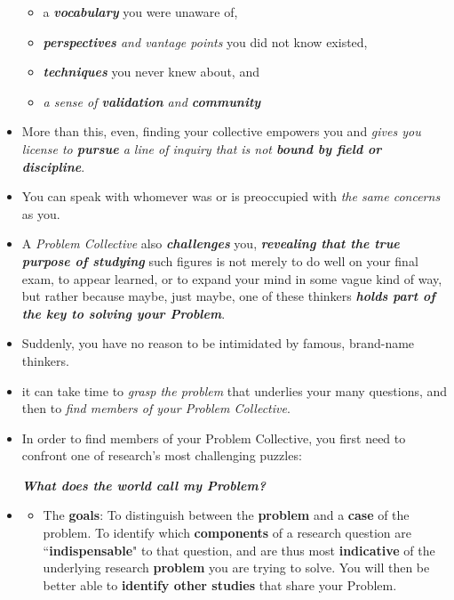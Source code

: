 \documentclass[11pt]{article}
\begin{document}
\begin{itemize}
\begin{itemize}
\item a \emph{\textbf{vocabulary}} you were unaware of,

\item \emph{\textbf{perspectives} and vantage points} you did not know existed,

\item \emph{\textbf{techniques}} you never knew about, and

\item \emph{a sense of \textbf{validation} and \textbf{community}}
\end{itemize}

\item More than this, even, finding your collective empowers you and \emph{gives you license to \textbf{pursue} a line of inquiry that is not \textbf{bound by field or discipline}}.

\item You can speak with whomever was or is preoccupied with \emph{the same concerns} as you.

\item A \emph{Problem Collective} also \emph{\textbf{challenges}} you, \emph{\textbf{revealing that the true purpose of studying}} such figures is not merely to do well on your final exam, to appear learned, or to expand your mind in some vague kind of way, but rather because maybe, just maybe, one of these thinkers \emph{\textbf{holds part of the key to solving your Problem}}.

\item Suddenly, you have no reason to be intimidated by famous, brand-name thinkers.

\item it can take time to \emph{grasp the problem} that underlies your many questions, and then to \emph{find members of your Problem Collective}. 

\item In order to find members of your Problem Collective, you first need to confront one of research’s most challenging puzzles: 

\emph{\textbf{What does the world call my Problem?}}

\item  \begin{exercise}
\begin{itemize}
\item The \textbf{goals}: To distinguish between the \textbf{problem} and a \textbf{case} of the problem. To identify which \textbf{components} of a research question are ``\textbf{indispensable}" to that question, and are thus most \textbf{indicative} of the underlying research \textbf{problem} you are trying to solve. You will then be better able to \textbf{identify other studies} that share your Problem.


\end{itemize}
\end{exercise}
\end{itemize}
\end{document}
